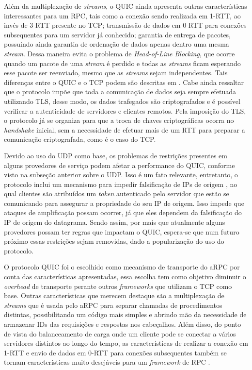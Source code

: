 Além da multiplexação de \textit{streams}, o QUIC ainda apresenta outras características interessantes para um RPC, tais como a conexão sendo realizada em 1-RTT, ao invés de 3-RTT presente no TCP; transmissão de dados em 0-RTT para conexões subsequentes para um servidor já conhecido; garantia de entrega de pacotes, possuindo ainda garantia de ordenação de dados apenas dentro uma mesma \textit{stream}. Dessa maneira evita o problema de \textit{Head-of-Line Blocking}, que ocorre quando um pacote de uma \textit{stream} é perdido e todas as \textit{streams} ficam esperando esse pacote ser reenviado, mesmo que as \emph{streams} sejam independentes. Tais diferenças entre o QUIC e o TCP podem  são descritas em \cite{cook_quic_2017}. Cabe ainda ressaltar que o protocolo impõe que toda a comunicação de dados seja sempre efetuada utilizando TLS, desse modo, os dados trafegados são criptografados e é possível verificar a autenticidade de servidores e clientes remotos. Pela imposição do TLS, o protocolo já se organiza para que a troca de chaves criptográficas ocorra no \textit{handshake} inicial, sem a necessidade de efetuar mais de um RTT para preparar a comunicação criptografada, como é o caso do TCP.

Devido ao uso do UDP como base, os problemas de restrições presentes em alguns provedores de serviço podem afetar a performance do QUIC, conforme visto na subseção anterior sobre o UDP. Isso é um fato relevante, entretanto, o protocolo inclui um mecanismo para impedir falsificação de IPs de origem \cite{rossow2014amplification}, no qual clientes são atribuídos um \textit{token} autenticado pelo servidor que estão se comunicando para assegurar a propriedade do seu IP de origem. Isso impede que ataques de amplificação possam ocorrer, já que eles dependem da falsificação do IP de origem do datagrama. Sendo assim, por mais que atualmente alguns provedores possam ter regras que impactam o QUIC, espera-se que num futuro próximo essas restrições sejam removidas, dado a popularização do uso do protocolo.

O protocolo QUIC foi o escolhido como mecanismo de transporte do aRPC por conta das características apresentadas, essa escolha tem como objetivo diminuir o \textit{overhead} de transporte perante outros \textit{frameworks} que utilizam o TCP como base. Outras características que merecem destaque são a multiplexação de \textit{streams} que é usada pelo aRPC para separar chamadas de procedimentos distintas, possibilitando um código mais simples e abrindo mão da necessidade de armazenar IDs das requisições e respostas nos cabeçalhos. Além disso, do ponto de vista do balanceamento de carga onde um cliente pode se conectar a vários servidores distintos ao longo do tempo, as características de realizar a conexão em 1-RTT e envio de dados em 0-RTT para conexões subsequentes também se tornam características muito desejáveis para um \textit{framework} de RPC \cite{fatemian_why_2020}.

